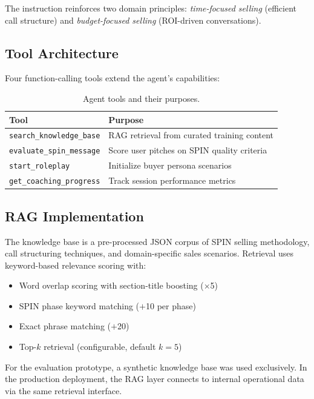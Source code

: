 \documentclass[10pt,twocolumn,a4paper]{article}
\begin{document}
The instruction reinforces two domain principles: \textit{time-focused selling} (efficient call structure) and \textit{budget-focused selling} (ROI-driven conversations).

\subsection{Tool Architecture}

Four function-calling tools extend the agent's capabilities:

\begin{table}[t]
\caption{Agent tools and their purposes.}
\label{tab:tools}
\setlength{\tabcolsep}{36pt}
\renewcommand{\arraystretch}{1.4}
\begin{tabular}{l l}
\toprule
\textbf{Tool} & \textbf{Purpose} \\
\midrule
\texttt{search\_knowledge\_base} & RAG retrieval from curated training content \\
\texttt{evaluate\_spin\_message} & Score user pitches on SPIN quality criteria \\
\texttt{start\_roleplay} & Initialize buyer persona scenarios \\
\texttt{get\_coaching\_progress} & Track session performance metrics \\
\bottomrule
\end{tabular}
\end{table}

\subsection{RAG Implementation}

The knowledge base is a pre-processed JSON corpus of SPIN selling methodology, call structuring techniques, and domain-specific sales scenarios. Retrieval uses keyword-based relevance scoring with:
\begin{itemize}[leftmargin=*,noitemsep,topsep=2pt]
    \item Word overlap scoring with section-title boosting ($\times$5)
    \item SPIN phase keyword matching ($+$10 per phase)
    \item Exact phrase matching ($+$20)
    \item Top-$k$ retrieval (configurable, default $k\!=\!5$)
\end{itemize}

For the evaluation prototype, a synthetic knowledge base was used exclusively. In the production deployment, the RAG layer connects to internal operational data via the same retrieval interface.
\end{document}
